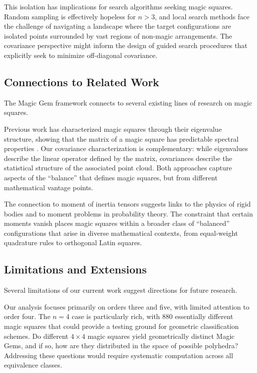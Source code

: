 This isolation has implications for search algorithms seeking magic squares.
Random sampling is effectively hopeless for $n > 3$, and local search methods face 
the challenge of navigating a landscape where the target configurations are isolated points 
surrounded by vast regions of non-magic arrangements.
The covariance perspective might inform the design of guided search procedures
that explicitly seek to minimize off-diagonal covariance.

\subsection{Connections to Related Work}

The Magic Gem framework connects to several existing lines of research on magic squares.

Previous work has characterized magic squares through their eigenvalue structure,
showing that the matrix of a magic square has predictable spectral properties
\cite{loly2004eigenproperties, nordgren2012spectral, chan2013eigenvalues}.
Our covariance characterization is complementary: 
while eigenvalues describe the linear operator defined by the matrix,
covariances describe the statistical structure of the associated point cloud.
Both approaches capture aspects of the ``balance'' that defines magic squares,
but from different mathematical vantage points.

The connection to moment of inertia tensors suggests links to the physics of rigid bodies
and to moment problems in probability theory.
The constraint that certain moments vanish places magic squares within a broader class
of ``balanced'' configurations that arise in diverse mathematical contexts,
from equal-weight quadrature rules to orthogonal Latin squares.

\subsection{Limitations and Extensions}

Several limitations of our current work suggest directions for future research.

Our analysis focuses primarily on orders three and five, with limited attention to order four.
The $n = 4$ case is particularly rich, with 880 essentially different magic squares
that could provide a testing ground for geometric classification schemes.
Do different $4 \times 4$ magic squares yield geometrically distinct Magic Gems,
and if so, how are they distributed in the space of possible polyhedra?
Addressing these questions would require systematic computation across all equivalence classes.

